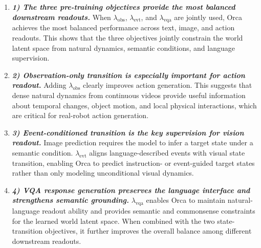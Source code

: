 \begin{enumerate}[
    leftmargin=1.35em,
    itemsep=0.35em,
    topsep=0.35em,
    parsep=0em
]
\item[] \textit{\textbf{1) The three pre-training objectives provide the most balanced downstream readouts.}}
When $\lambda_{\mathrm{obs}}$, $\lambda_{\mathrm{evt}}$, and $\lambda_{\mathrm{vqa}}$ are jointly used, Orca achieves the most balanced performance across text, image, and action readouts. This shows that the three objectives jointly constrain the world latent space from natural dynamics, semantic conditions, and language supervision.

\item[] \textit{\textbf{2) Observation-only transition is especially important for action readout.}} 
Adding $\lambda_{\mathrm{obs}}$ clearly improves action generation. This suggests that dense natural dynamics from continuous videos provide useful information about temporal changes, object motion, and local physical interactions, which are critical for real-robot action generation.

\item[] \textit{\textbf{3) Event-conditioned transition is the key supervision for vision readout.}} 
Image prediction requires the model to infer a target state under a semantic condition. $\lambda_{\mathrm{evt}}$ aligns language-described events with visual state transition, enabling Orca to predict instruction- or event-guided target states rather than only modeling unconditional visual dynamics.

\item[] \textit{\textbf{4) VQA response generation preserves the language interface and strengthens semantic grounding.}} 
$\lambda_{\mathrm{vqa}}$ enables Orca to maintain natural-language readout ability and provides semantic and commonsense constraints for the learned world latent space. When combined with the two state-transition objectives, it further improves the overall balance among different downstream readouts.
\end{enumerate}
